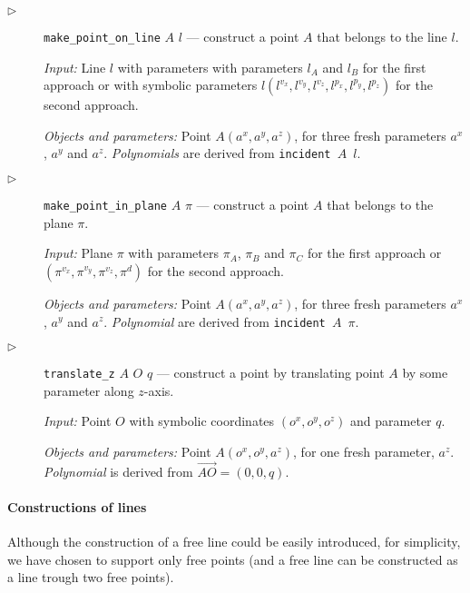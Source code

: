 \documentclass[final,1p,times,authoryear]{elsarticle}
\begin{document}
\begin{description}
\item[$\triangleright$] {\tt make\_point\_on\_line} $A$ $l$ ---
  construct a point $A$ that belongs to the line $l$.
  
  {\em Input:} Line $l$ with parameters with parameters $l_A$ and
  $l_B$ for the first approach or with symbolic parameters $l(l^{v_x},
  l^{v_y}, l^{v_z}, l^{p_x}, l^{p_y}, l^{p_z})$ for the second
  approach.

  {\em Objects and parameters:} Point $A(a^x, a^y, a^z)$, for three
  fresh parameters $a^x$, $a^y$ and $a^z$. {\em Polynomials} are
  derived from {\tt incident $A$ $l$}.

\item[$\triangleright$] {\tt make\_point\_in\_plane} $A$ $\pi$ ---
  construct a point $A$ that belongs to the plane $\pi$.
  
  {\em Input:} Plane $\pi$ with parameters $\pi_A$, $\pi_B$ and
  $\pi_C$ for the first approach or $(\pi^{v_x}, \pi^{v_y}, \pi^{v_z},
  \pi^{d})$ for the second approach.

  {\em Objects and parameters:} Point $A(a^x, a^y, a^z)$, for three
  fresh parameters $a^x$, $a^y$ and $a^z$. {\em Polynomial} are
  derived from {\tt incident $A$ $\pi$}.

\item[$\triangleright$] {\tt translate\_z} $A$ $O$ $q$ --- construct a point by translating point $A$
  by some parameter along $z$-axis.
  
  {\em Input:} Point $O$ with symbolic coordinates $(o^x, o^y, o^z)$
  and parameter $q$.

  {\em Objects and parameters:} Point $A(o^x, o^y, a^z)$, for one
  fresh parameter, $a^z$. {\em Polynomial} is derived from
  $\overrightarrow{AO} = (0, 0, q)$.
\end{description}


\paragraph{Constructions of lines}
Although the construction of a free line could be easily introduced,
for simplicity, we have chosen to support only free points (and a free
line can be constructed as a line trough two free points).
\end{document}

